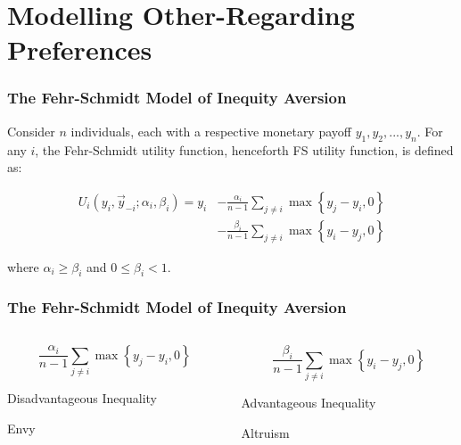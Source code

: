 \documentclass{beamer}
\begin{document}
\section{Modelling Other-Regarding Preferences}


\begin{frame}
	\frametitle{The Fehr-Schmidt Model of Inequity Aversion}
	
	Consider $n$ individuals, each with a respective monetary payoff $y_1,y_2,...,y_n$. For any $i$, the Fehr-Schmidt utility function, henceforth FS utility function, is defined as:
	
	\begin{equation}
	\begin{split}
	U_i\left(y_i,\vec{y}_{-i};\alpha_i,\beta_i\right) = y_i & -  \frac{\alpha_i}{n-1} \sum_{j\neq i} \max \left \{ y_j - y_i,0 \right \} \\
	& - \frac{\beta_i}{n-1} \sum_{j\neq i} \max \left \{ y_i - y_j,0 \right \}
	\end{split}
	\end{equation}

where $\alpha_i \geq \beta_i$ and $0 \leq \beta_i <1$.

\end{frame}

\begin{frame}
	\frametitle{The Fehr-Schmidt Model of Inequity Aversion}
\begin{columns}
	\begin{column}{0.5\textwidth}
		\begin{equation*}
			\frac{\alpha_i}{n-1} \sum_{j\neq i} \max \left \{ y_j - y_i,0 \right \} 
		\end{equation*}
		\begin{center}
			Disadvantageous Inequality
		\end{center}
		\begin{center}
		Envy
		\end{center}
	\end{column}
	\begin{column}{0.5\textwidth}  %
		\begin{equation*}
\frac{\beta_i}{n-1} \sum_{j\neq i} \max \left \{ y_i - y_j,0 \right \}
\end{equation*}
\begin{center}
	Advantageous Inequality
\end{center}
\begin{center}
	Altruism
\end{center}
	\end{column}
\end{columns}
\end{frame}
\end{document}
